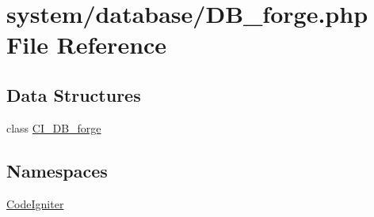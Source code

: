 \hypertarget{_d_b__forge_8php}{}\section{system/database/\+D\+B\+\_\+forge.php File Reference}
\label{_d_b__forge_8php}
\subsection*{Data Structures}
\begin{DoxyCompactItemize}
\item 
class \mbox{\hyperlink{class_c_i___d_b__forge}{C\+I\+\_\+\+D\+B\+\_\+forge}}
\end{DoxyCompactItemize}
\subsection*{Namespaces}
\begin{DoxyCompactItemize}
\item 
 \mbox{\hyperlink{namespace_code_igniter}{Code\+Igniter}}
\end{DoxyCompactItemize}
